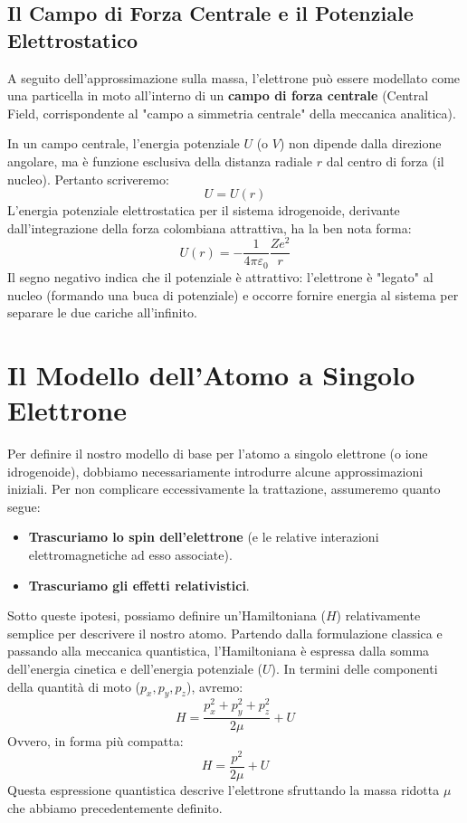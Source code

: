 \subsection{Il Campo di Forza Centrale e il Potenziale Elettrostatico}

A seguito dell'approssimazione sulla massa, l'elettrone può essere modellato come una particella in moto all'interno di un \textbf{campo di forza centrale} (Central Field, corrispondente al "campo a simmetria centrale" della meccanica analitica).

In un campo centrale, l'energia potenziale $U$ (o $V$) non dipende dalla direzione angolare, ma è funzione esclusiva della distanza radiale $r$ dal centro di forza (il nucleo). Pertanto scriveremo:
\begin{equation}
U = U(r)
\end{equation}
L'energia potenziale elettrostatica per il sistema idrogenoide, derivante dall'integrazione della forza colombiana attrattiva, ha la ben nota forma:
\begin{equation}
U(r) = - \frac{1}{4\pi\varepsilon_0} \frac{Ze^2}{r}
\end{equation}
Il segno negativo indica che il potenziale è attrattivo: l'elettrone è "legato" al nucleo (formando una buca di potenziale) e occorre fornire energia al sistema per separare le due cariche all'infinito.

\section{Il Modello dell'Atomo a Singolo Elettrone}

Per definire il nostro modello di base per l'atomo a singolo elettrone (o ione idrogenoide), dobbiamo necessariamente introdurre alcune approssimazioni iniziali. Per non complicare eccessivamente la trattazione, assumeremo quanto segue:
\begin{itemize}
\item \textbf{Trascuriamo lo spin dell'elettrone} (e le relative interazioni elettromagnetiche ad esso associate).
\item \textbf{Trascuriamo gli effetti relativistici}.
\end{itemize}

Sotto queste ipotesi, possiamo definire un'Hamiltoniana ($H$) relativamente semplice per descrivere il nostro atomo. Partendo dalla formulazione classica e passando alla meccanica quantistica, l'Hamiltoniana è espressa dalla somma dell'energia cinetica e dell'energia potenziale ($U$). In termini delle componenti della quantità di moto ($p_x, p_y, p_z$), avremo:
\begin{equation}
H = \frac{p_x^2 + p_y^2 + p_z^2}{2\mu} + U
\end{equation}
Ovvero, in forma più compatta:
\begin{equation}
H = \frac{p^2}{2\mu} + U
\end{equation}
Questa espressione quantistica descrive l'elettrone sfruttando la massa ridotta $\mu$ che abbiamo precedentemente definito.

